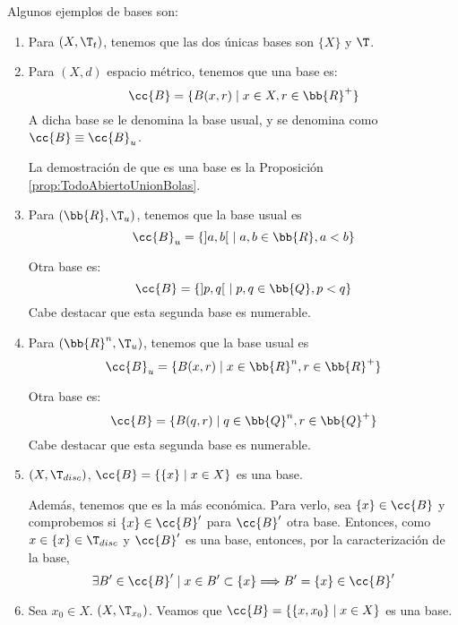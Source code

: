 \begin{ejemplo}
    Algunos ejemplos de bases son:
    \begin{enumerate}
        \item Para $(X,\T_t)$, tenemos que las dos únicas bases son $\{X\}$ y $\T$.

        \item Para $(X,d)$ espacio métrico, tenemos que una base es:
        \begin{equation*}
            \cc{B}=\{B(x,r)\mid x\in X,r\in \bb{R}^+\}
        \end{equation*}
        A dicha base se le denomina la base usual, y se denomina como $\cc{B}\equiv\cc{B}_u$.

        La demostración de que es una base es la Proposición \ref{prop:TodoAbiertoUnionBolas}.

        \item Para $(\bb{R},\T_u)$, tenemos que la base usual es $$\cc{B}_u=\{]a,b[~\mid a,b\in \bb{R}, a<b\}$$

        Otra base es:
        \begin{equation*}
            \cc{B}=\{]p,q[~\mid p,q\in \bb{Q},p<q\}
        \end{equation*}
        Cabe destacar que esta segunda base es numerable.

        \item Para $(\bb{R}^n,\T_u)$, tenemos que la base usual es $$\cc{B}_u=\{B(x,r)\mid x\in \bb{R}^n, r\in \bb{R}^+\}$$

        Otra base es:
        \begin{equation*}
            \cc{B}=\{B(q,r)\mid q\in \bb{Q}^n, r\in \bb{Q}^+\}
        \end{equation*}
        Cabe destacar que esta segunda base es numerable.

        \item $(X,\T_{disc})$, $\cc{B}=\left\{\{x\}\mid x\in X\right\}$ es una base.
        
        Además, tenemos que es la más económica. Para verlo, sea $\{x\}\in \cc{B}$ y comprobemos si $\{x\}\in \cc{B}'$ para $\cc{B}'$ otra base. Entonces, como $x\in \{x\}\in \T_{disc}$ y $\cc{B}'$ es una base, entonces, por la caracterización de la base,
        $$\exists B'\in \cc{B}'\mid x\in B'\subset \{x\}\Longrightarrow B'=\{x\}\in \cc{B}'$$
        
        \item Sea $x_0\in X$. $(X,\T_{x_0})$. Veamos que $\cc{B}=\left\{\{x,x_0\}\mid x\in X\right\}$ es una base.


\end{enumerate}
\end{ejemplo}

